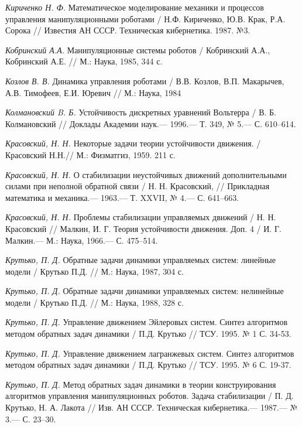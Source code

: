 \begin{thebibliography}{10}
	{\it Кириченко Н. Ф.} Математическое моделирование механики и процессов управления манипуляционными роботами / Н.Ф. Кириченко, Ю.В. Крак, Р.А. Сорока // Известия АН СССР. Техническая кибернетика. 1987. №3.
	
	{\it Кобринский А.А.} Манипуляционные системы роботов / Кобринский А.А., Кобринский А.Е. // М.: Наука, 1985, 344 с.
	
	{\it Козлов В. В.} Динамика управления роботами / В.В. Козлов, В.П. Макарычев, А.В. Тимофеев, Е.И. Юревич // М.: Наука, 1984
	
	{\it Колмановский B. Б.} Устойчивость дискретных уравнений Вольтерра / В. Б. Колмановский // Доклады Академии наук.— 1996.— Т. 349, № 5.— С. 610–614.
	
	{\it Красовский, Н. Н.} Некоторые задачи теории устойчивости движения. / Красовский Н.Н.// М.:
	Физматгиз, 1959. 211 с.
	
	{\it Красовский, Н. Н.} О стабилизации неустойчивых движений дополнительными силами при неполной обратной связи / Н. Н. Красовский,
	// Прикладная математика и механика.— 1963.— Т. XXVII, № 4.— С. 641–663.
	
	{\it Красовский, Н. Н.} Проблемы стабилизации управляемых движений / Н. Н. Красовский
	// Малкин, И. Г. Теория устойчивости движения. Доп. 4 / И. Г. Малкин.— М.:
	Наука, 1966.— С. 475–514.
	
	{\it Крутько, П. Д.} Обратные задачи динамики управляемых систем: линейные модели / Крутько П.Д. // М.: Наука, 1987, 304 с.
	
	{\it Крутько, П. Д.} Обратные задачи динамики управляемых систем: нелинейные модели / Крутько П.Д. // М.: Наука, 1988, 328 с.
	
	{\it Крутько, П. Д.} Управление движением Эйлеровых систем. Синтез алгоритмов методом обратных задач динамики / П.Д. Крутько // ТСУ. 1995. № 1 С. 34-53.
	
	{\it Крутько, П. Д.} Управление движением лагранжевых систем. Синтез алгоритмов методом обратных задач динамики / П.Д. Крутько // ТСУ. 1995. № 6 С. 19-37.
	
	{\it Крутько, П. Д.} Метод обратных задач динамики в теории конструирования алгоритмов
	управления манипуляционных роботов. Задача стабилизации / П. Д. Крутько, Н. А. Лакота
	// Изв. АН СССР. Техническая кибернетика.— 1987.— № 3.— С. 23–30.


\end{thebibliography}

